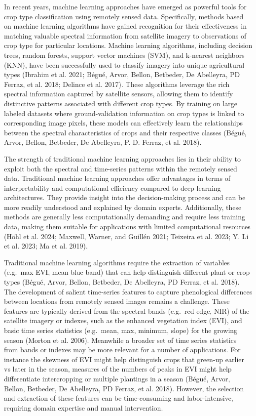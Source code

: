 \documentclass[
  journal,
  twocolumn]{IEEEtran}
\begin{document}
In recent years, machine learning approaches have emerged as powerful
tools for crop type classification using remotely sensed data.
Specifically, methods based on machine learning algorithms have gained
recognition for their effectiveness in matching valuable spectral
information from satellite imagery to observations of crop type for
particular locations. Machine learning algorithms, including decision
trees, random forests, support vector machines (SVM), and k-nearest
neighbors (KNN), have been successfully used to classify imagery into
unique agricultural types (Ibrahim et al. 2021; Bégué, Arvor, Bellon,
Betbeder, De Abelleyra, PD Ferraz, et al. 2018; Delince et al. 2017).
These algorithms leverage the rich spectral information captured by
satellite sensors, allowing them to identify distinctive patterns
associated with different crop types. By training on large labeled
datasets where ground-validation information on crop types is linked to
corresponding image pixels, these models can effectively learn the
relationships between the spectral characteristics of crops and their
respective classes (Bégué, Arvor, Bellon, Betbeder, De Abelleyra, P. D.
Ferraz, et al. 2018).

The strength of traditional machine learning approaches lies in their
ability to exploit both the spectral and time-series patterns within the
remotely sensed data. Traditional machine learning approaches offer
advantages in terms of interpretability and computational efficiency
compared to deep learning architectures. They provide insight into the
decision-making process and can be more readily understood and explained
by domain experts. Additionally, these methods are generally less
computationally demanding and require less training data, making them
suitable for applications with limited computational resources (Höhl et
al. 2024; Maxwell, Warner, and Guillén 2021; Teixeira et al. 2023; Y. Li
et al. 2023; Ma et al. 2019).

Traditional machine learning algorithms require the extraction of
variables (e.g.~max EVI, mean blue band) that can help distinguish
different plant or crop types (Bégué, Arvor, Bellon, Betbeder, De
Abelleyra, PD Ferraz, et al. 2018). The development of salient
time-series features to capture phenological differences between
locations from remotely sensed images remains a challenge. These
features are typically derived from the spectral bands (e.g.~red edge,
NIR) of the satellite imagery or indexes, such as the enhanced
vegetation index (EVI), and basic time series statistics (e.g.~mean,
max, minimum, slope) for the growing season (Morton et al. 2006).
Meanwhile a broader set of time series statistics from bands or indexes
may be more relevant for a number of applications. For instance the
skewness of EVI might help distinguish crops that green-up earlier vs
later in the season, measures of the numbers of peaks in EVI might help
differentiate intercropping or multiple plantings in a season (Bégué,
Arvor, Bellon, Betbeder, De Abelleyra, PD Ferraz, et al. 2018). However,
the selection and extraction of these features can be time-consuming and
labor-intensive, requiring domain expertise and manual intervention.
\end{document}
